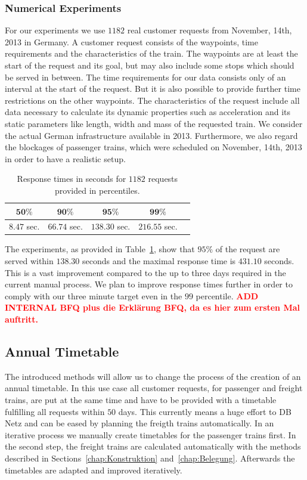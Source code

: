 \subsubsection{Numerical Experiments}
For our experiments we use $1182$ real customer requests from November, 14th, 2013 in Germany. A customer request consists of the waypoints, time requirements and the characteristics of the train. The waypoints are at least the start of the request and its goal, but may also include some stops which should be served in between. The time requirements for our data consists only of an interval at the start of the request. But it is also possible to provide further time restrictions on the other waypoints. The characteristics of the request include all data necessary to calculate its dynamic properties such as acceleration and its static parameters like length, width and mass of the requested train. We consider the actual German infrastructure available in 2013. Furthermore, we also regard the blockages of passenger trains, which were scheduled on November, 14th, 2013 in order to have a realistic setup.
%
\begin{table}[h]
	\centering
	\caption{Response times in seconds for $1182$ requests provided in percentiles.}
	\label{tab:result_CnR}
	\begin{tabular}{ccccc} \hline
		$\textbf{50\%}$ & $\textbf{90\%}$ & $\textbf{95\%}$ & $\textbf{99\%}$ \\ \hline
		$8.47$ sec.     & $66.74$ sec.    & $138.30$ sec.   & $216.55$ sec.   \\
	\end{tabular}
\end{table}
\par

The experiments, as provided in Table~\ref{tab:result_CnR}, show that $95\%$ of the request are served within $138.30$ seconds and the maximal response time is $431.10$ seconds. This is a vast improvement compared to the up to three days required in the current manual process. We plan to improve response times further in order to comply with our three minute target even in the $99$ percentile.
\textbf{\textcolor{red}{ADD INTERNAL BFQ plus die Erklärung BFQ, da es hier zum ersten Mal auftritt.}}

\subsection{Annual Timetable}
\label{chap:Netzfahrplan}

The introduced methods will allow us to change the process of the creation of an annual timetable. In this use case all customer requests, for passenger and freight trains, are put at the same time and have to be provided with a timetable fulfilling all requests within $50$ days. This currently means a huge effort to DB Netz and can be eased by planning the freigth trains automatically. In an iterative process we manually create timetables for the passenger trains first. In the second step, the freight trains are calculated automatically with the methods described in Sections~\ref{chap:Konstruktion} and~\ref{chap:Belegung}. Afterwards the timetables are adapted and improved iteratively.

